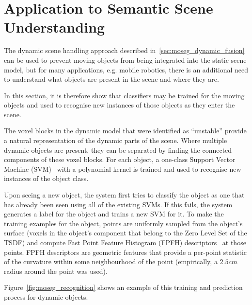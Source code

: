 \section{Application to Semantic Scene Understanding}
\label{sec:moseg_semantic}
The dynamic scene handling approach described in~\ref{sec:moseg_dynamic_fusion}
can be used to prevent moving objects from being integrated into the static
scene model, but for many applications, e.g. mobile robotics, there is an
additional need to understand what objects are present in the scene and where
they are.

In this section, it is therefore show that classifiers may be trained for the
moving objects and used to recognise new instances of those objects as they
enter the scene.

The voxel blocks in the dynamic model that were identified as ``unstable''
provide a natural representation of the dynamic parts of the scene. Where
multiple dynamic objects are present, they can be separated by finding the
connected components of these voxel blocks. For each object, a one-class Support
Vector Machine (SVM)~\cite{PEGASOS} with a polynomial kernel is trained and used 
to recognise new instances of the object class.

Upon seeing a new object, the system first tries to classify the object as one
that has already been seen using all of the existing SVMs. If this fails, the
system generates a label for the object and trains a new SVM for it. To make the
training examples for the object, points are uniformly sampled from the object's
surface (voxels in the object's component that belong to the Zero Level Set of the 
TSDF) and compute Fast Point Feature Histogram (FPFH) descriptors~\cite{Rusu2009} 
at those points. FPFH descriptors are geometric features that provide a
per-point statistic of the curvature within some neighbourhood of the point
(empirically, a \(2.5cm\) radius around the point was used).

Figure~\ref{fig:moseg_recognition} shows an example of this training and
prediction process for dynamic objects.

